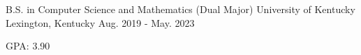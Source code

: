 

\begin{cventries}

  \cventry
    {B.S. in Computer Science and Mathematics (Dual Major)} %
    {University of Kentucky} %
    {Lexington, Kentucky} %
    {Aug. 2019 - May. 2023} %
    {
      \begin{cvitems} %
        \item {GPA: 3.90}
      \end{cvitems}
    }

\end{cventries}
